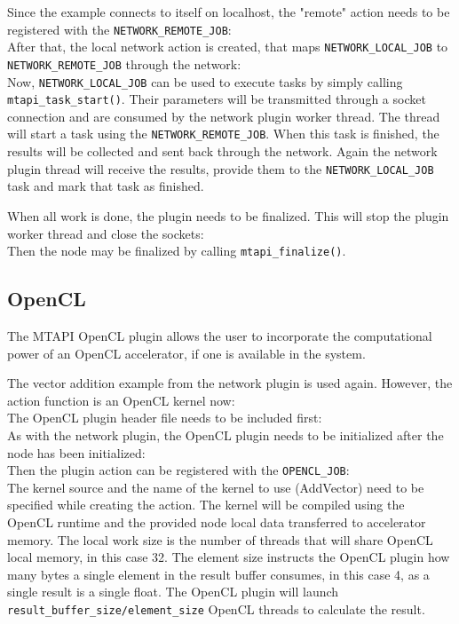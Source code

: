 Since the example connects to itself on localhost, the "remote" action needs to be registered with the \lstinline|NETWORK_REMOTE_JOB|:
%
\\
%
After that, the local network action is created, that maps \lstinline|NETWORK_LOCAL_JOB| to \lstinline|NETWORK_REMOTE_JOB| through the network:
%
\\
%
Now, \lstinline|NETWORK_LOCAL_JOB| can be used to execute tasks by simply calling \lstinline|mtapi_task_start()|. Their parameters will be transmitted through a socket connection and are consumed by the network plugin worker thread. The thread will start a task using the \lstinline|NETWORK_REMOTE_JOB|. When this task is finished, the results will be collected and sent back through the network. Again the network plugin thread will receive the results, provide them to the \lstinline|NETWORK_LOCAL_JOB| task and mark that task as finished.

When all work is done, the plugin needs to be finalized. This will stop the plugin worker thread and close the sockets:
%
\\
%
Then the node may be finalized by calling \lstinline|mtapi_finalize()|.

\subsection{OpenCL}

The MTAPI OpenCL plugin allows the user to incorporate the computational power of an OpenCL accelerator, if one is available in the system.

The vector addition example from the network plugin is used again. However, the action function is an OpenCL kernel now:
%
\\
%
The OpenCL plugin header file needs to be included first:
%
\\
%
As with the network plugin, the OpenCL plugin needs to be initialized after the node has been initialized:
%
\\
%
Then the plugin action can be registered with the \lstinline|OPENCL_JOB|:
%
\\
%
The kernel source and the name of the kernel to use (AddVector) need to be specified while creating the action. The kernel will be compiled using the OpenCL runtime and the provided node local data transferred to accelerator memory. The local work size is the number of threads that will share OpenCL local memory, in this case 32. The element size instructs the OpenCL plugin how many bytes a single element in the result buffer consumes, in this case 4, as a single result is a single float. The OpenCL plugin will launch \lstinline|result_buffer_size/element_size| OpenCL threads to calculate the result.

